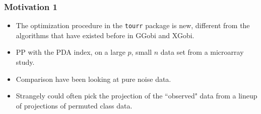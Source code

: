 \documentclass{beamer}
\begin{document}
\begin{frame}
     \frametitle{Motivation 1 }
\begin{itemize}
\item The optimization procedure in the  \texttt{tourr} package is new, different from the algorithms that have existed before in GGobi %
and XGobi. %
\item  PP with the PDA index, on a large $p$, small $n$ data set from a microarray study.
\item Comparison have been looking at pure noise data. 
\item Strangely could often pick the projection of the  ``observed" data from a lineup of projections of permuted class data. 

\end{itemize}	
\end{frame}
\end{document}
